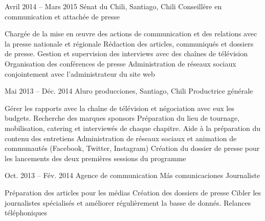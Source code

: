 \documentclass{tccv}
\begin{document}
\begin{eventlist}

\item{Avril 2014 -- Mars 2015}
     {Sénat du Chili, Santiago, Chili}
     {Conseillère en communication et attachée de presse}

    \begin{itemize}
      \setlength\itemsep{0cm} 
      \cvitem[\checkmark] Chargée de la mise en œuvre des actions de communication et des relations avec la presse nationale et régionale
      \cvitem[\checkmark] Rédaction des articles, communiqués et dossiers de presse. Gestion et supervision des interviews avec des chaînes de télévision
      \cvitem[\checkmark] Organisation des conférences de presse
      \cvitem[\checkmark] Administration de réseaux sociaux conjointement avec l’administrateur du site web
    \end{itemize}     
     


\item{Mai 2013 -- Déc. 2014}
     {Aluro producciones, Santiago, Chili}
     {Productrice générale}
    
    \begin{itemize}
      \setlength\itemsep{0cm} 
      \cvitem[\checkmark] Gérer les rapports avec la chaîne de télévision et négociation avec eux les budgets. Recherche des marques sponsors
      \cvitem[\checkmark] Préparation du lieu de tournage, mobilisation, catering et interviewés de chaque chapitre. Aide à la préparation du contenu des entretiens
      \cvitem[\checkmark] Administration de réseaux sociaux et animation de communautés (Facebook, Twitter, Instagram)
      \cvitem[\checkmark] Création du dossier de presse pour les lancements des deux premières sessions du programme

    \end{itemize}     

\item{Oct. 2013 -- Fév. 2014 }     
  {Agence de communication Más comunicaciones}     
  {Journaliste}

\begin{itemize}
      \setlength\itemsep{0cm} 
      \cvitem[\checkmark] Préparation des articles pour les médias
      \cvitem[\checkmark] Création des dossiers de presse 
      \cvitem[\checkmark] Cibler les journalistes spécialisés et améliorer régulièrement la basse de donnés. 
      \cvitem[\checkmark] Relances téléphoniques
\end{itemize}       




\end{eventlist}
\end{document}
